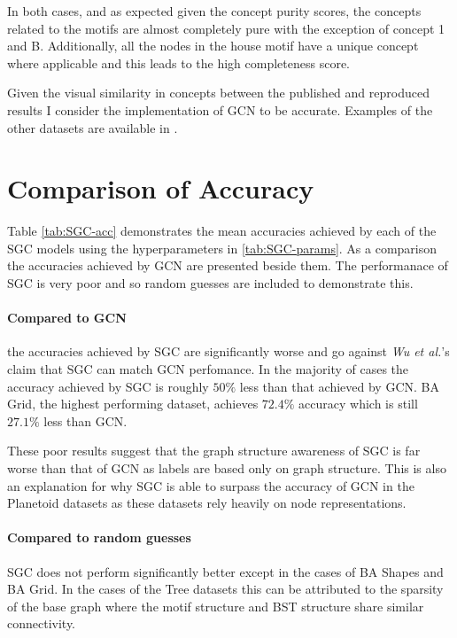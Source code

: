 In both cases, and as expected given the concept purity scores, the concepts related to the motifs are almost completely pure with the exception of concept 1 and B.
Additionally, all the nodes in the house motif have a unique concept where applicable and this leads to the high completeness score.

Given the visual similarity in concepts between the published and reproduced results I consider the implementation of GCN to be accurate.
Examples of the other datasets are available in .

\section{Comparison of Accuracy}
\label{sec:comp-acc}


Table \ref{tab:SGC-acc} demonstrates the mean accuracies achieved by each of the SGC models using the hyperparameters in \ref{tab:SGC-params}.
As a comparison the accuracies achieved by GCN are presented beside them.
The performanace of SGC is very poor and so random guesses are included to demonstrate this.

\paragraph{Compared to GCN}
the accuracies achieved by SGC are significantly worse and go against \textit{Wu et al.}'s claim that SGC can match GCN perfomance.
In the majority of cases the accuracy achieved by SGC is roughly $50\%$ less than that achieved by GCN.
BA Grid, the highest performing dataset, achieves $72.4\%$ accuracy which is still $27.1\%$ less than GCN.

These poor results suggest that the graph structure awareness of SGC is far worse than that of GCN as labels are based only on graph structure.
This is also an explanation for why SGC is able to surpass the accuracy of GCN in the Planetoid\cite{kipf2016semi} datasets as these datasets rely heavily on node representations.

\paragraph{Compared to random guesses}
SGC does not perform significantly better except in the cases of BA Shapes and BA Grid.
In the cases of the Tree datasets this can be attributed to the sparsity of the base graph where the motif structure and BST structure share similar connectivity.

